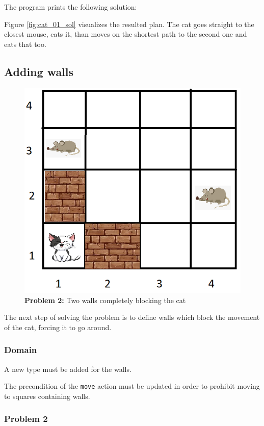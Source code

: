 The program prints the following solution:



Figure \ref{fig:cat_01_sol} visualizes the resulted plan. The cat goes straight to the closest mouse, eats it, than moves on the shortest path to the second one and eats that too.






\subsection{Adding walls}

\begin{figure}[H]
    \centering
    \includegraphics[width=.5\linewidth]{fig/A3/cat_02.png}
    \caption{\textbf{Problem 2:} Two walls completely blocking the cat}
    \label{fig:cat_02}
\end{figure}

The next step of solving the problem is to define walls which block the movement of the cat, forcing it to go around.


\subsubsection{Domain}

A new type must be added for the walls.



The precondition of the \verb|move| action must be updated in order to prohibit moving to squares containing walls.




\subsubsection{Problem 2}

